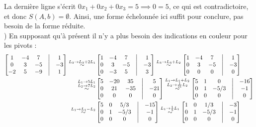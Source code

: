 \documentclass{article}
\begin{document}
La dernière ligne s'écrit $0x_1 + 0 x_2 + 0x_3 = 5 \implies 0=5$, ce qui est contradictoire, et donc $S(A,b) = \emptyset$. Ainsi, une forme échelonnée ici suffit pour conclure, pas besoin de la forme réduite. \\

) En supposant qu'à présent il n'y a plus besoin des indications en couleur pour les pivots :\begin{align*}
    \begin{bmatrix}
    1 & -4 & 7 & \bigm| & 1 \\
    0 & 3 & -5 & \bigm| & -3 \\
    -2 & 5 & -9 & \bigm| & 1
    \end{bmatrix}
    \overset{L_3 \rightarrow L_3+2L_1}{\sim}
    &\begin{bmatrix}
    1 & -4 & 7 & \bigm| & 1 \\
    0 & 3 & -5 & \bigm| & -3 \\
    0 & -3 & 5 & \bigm| & 3
    \end{bmatrix}
    \overset{L_3 \rightarrow L_3+L_2}{\sim}
    \begin{bmatrix}
    1 & -4 & 7 & \bigm| & 1 \\
    0 & 3 & -5 & \bigm| & -3 \\
    0 & 0 & 0 & \bigm| & 0
    \end{bmatrix} \\
    \overset{\substack{L_1 \rightarrow 5L_1 \\ L_2 \rightarrow 7L_2}}{\sim}
    &\begin{bmatrix}
    5 & -20 & 35 & \bigm| & 5 \\
    0 & 21 & -35 & \bigm| & -21 \\
    0 & 0 & 0 & \bigm| & 0
    \end{bmatrix}
    \overset{\substack{L_1 \rightarrow L_1+L_2 \\ L_2 \rightarrow \frac{1}{21}L_2}}{\sim}
    \begin{bmatrix}
    5 & 1 & 0 & \bigm| & -16 \\
    0 & 1 & -5/3 & \bigm| & -1 \\
    0 & 0 & 0 & \bigm| & 0
    \end{bmatrix} \\
    \overset{L_1 \rightarrow L_1-L_2}{\sim}
    &\begin{bmatrix}
    5 & 0 & 5/3 & \bigm| & -15 \\
    0 & 1 & -5/3 & \bigm| & -1 \\
    0 & 0 & 0 & \bigm| & 0
    \end{bmatrix}
    \overset{L_1 \rightarrow \frac{1}{5}L_1}{\sim}
    \begin{bmatrix}
    1 & 0 & 1/3 & \bigm| & -3 \\
    0 & 1 & -5/3 & \bigm| & -1 \\
    0 & 0 & 0 & \bigm| & 0
    \end{bmatrix}
\end{align*}
\end{document}

